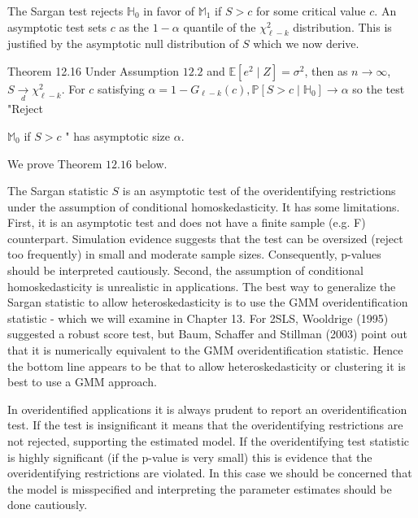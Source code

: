 \documentclass[10pt]{article}
\begin{document}
The Sargan test rejects $\mathbb{H}_{0}$ in favor of $\mathbb{M}_{1}$ if $S>c$ for some critical value $c$. An asymptotic test sets $c$ as the $1-\alpha$ quantile of the $\chi_{\ell-k}^{2}$ distribution. This is justified by the asymptotic null distribution of $S$ which we now derive.

Theorem 12.16 Under Assumption $12.2$ and $\mathbb{E}\left[e^{2} \mid Z\right]=\sigma^{2}$, then as $n \rightarrow \infty$, $S \underset{d}{\longrightarrow} \chi_{\ell-k}^{2}$. For $c$ satisfying $\alpha=1-G_{\ell-k}(c), \mathbb{P}\left[S>c \mid \mathbb{H}_{0}\right] \rightarrow \alpha$ so the test "Reject

$\mathbb{M}_{0}$ if $S>c$ " has asymptotic size $\alpha$.

We prove Theorem $12.16$ below.

The Sargan statistic $S$ is an asymptotic test of the overidentifying restrictions under the assumption of conditional homoskedasticity. It has some limitations. First, it is an asymptotic test and does not have a finite sample (e.g. F) counterpart. Simulation evidence suggests that the test can be oversized (reject too frequently) in small and moderate sample sizes. Consequently, p-values should be interpreted cautiously. Second, the assumption of conditional homoskedasticity is unrealistic in applications. The best way to generalize the Sargan statistic to allow heteroskedasticity is to use the GMM overidentification statistic - which we will examine in Chapter 13. For 2SLS, Wooldrige (1995) suggested a robust score test, but Baum, Schaffer and Stillman (2003) point out that it is numerically equivalent to the GMM overidentification statistic. Hence the bottom line appears to be that to allow heteroskedasticity or clustering it is best to use a GMM approach.

In overidentified applications it is always prudent to report an overidentification test. If the test is insignificant it means that the overidentifying restrictions are not rejected, supporting the estimated model. If the overidentifying test statistic is highly significant (if the p-value is very small) this is evidence that the overidentifying restrictions are violated. In this case we should be concerned that the model is misspecified and interpreting the parameter estimates should be done cautiously.
\end{document}

